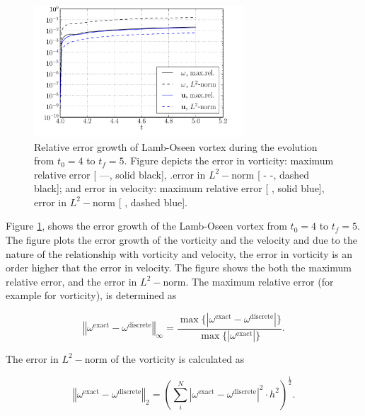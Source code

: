 	\begin{figure}[!t]
	\centering
	\includegraphics[width=0.7\textwidth]{figures/lagrangian/lambOseen_convection_errorGrowth_compressed.pdf}
	\caption{Relative error growth of Lamb-Oseen vortex during the evolution from $t_0=4$ to $t_f=5$. Figure depicts the error in vorticity: maximum relative error [ ---, solid black], .error in $L^2-\mathrm{norm}$ [ - -, dashed black]; and error in velocity: maximum relative error [ {\color{plotBlue}{---}}, solid blue], error in $L^2-\mathrm{norm}$ [ {\color{plotBlue}{- -}}, dashed blue].}
	\label{fig:lambOseen_convection_errorGrowth_compressed}
	\end{figure}

Figure \ref{fig:lambOseen_convection_errorGrowth_compressed}, shows the error growth of the Lamb-Oseen vortex from $t_0=4$ to $t_f=5$. The figure plots the error growth of the vorticity and the velocity and due to the nature of the relationship with vorticity and velocity, the error in vorticity is an order higher that the error in velocity. The figure shows the both the maximum relative error, and the error in $L^2-\mathrm{norm}$. The maximum relative error (for example for vorticity), is determined as

	\begin{equation}
	\left\Vert \omega^{\mathrm{exact}} - \omega^{\mathrm{discrete}} \right\Vert_{\infty} = \frac{\max\{\left|\omega^{\mathrm{exact}} - \omega^{\mathrm{discrete}}\right|\}}{\max\{\left|\omega^{\mathrm{exact}}\right|\}}.
	\end{equation}

The error in $L^2-\mathrm{norm}$ of the vorticity is calculated as 

	\begin{equation}
	\left\Vert \omega^{\mathrm{exact}} - \omega^{\mathrm{discrete}} \right\Vert_2 = \left(\sum_{i}^{N}\left| \omega^{\mathrm{exact}} - \omega^{\mathrm{discrete}} \right|^2 \cdot h^2\right)^{\frac{1}{2}}.
	\end{equation}

